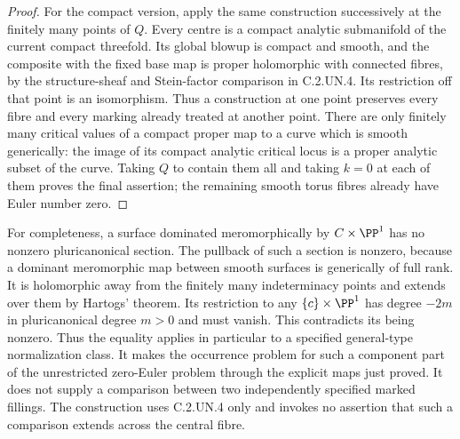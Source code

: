 \begin{proof}
For the compact version, apply the same construction successively
at the finitely many points of $Q$. Every centre is a compact
analytic submanifold of the current compact threefold. Its global
blowup is compact and smooth, and the composite with the fixed base
map is proper holomorphic with connected fibres, by the
structure-sheaf and Stein-factor comparison in C.2.UN.4. Its
restriction off that point is an isomorphism. Thus a construction
at one point preserves every fibre and every marking already
treated at another point. There are only finitely many critical
values of a compact proper map to a curve which is smooth
generically: the image of its compact analytic critical locus is
a proper analytic subset of the curve. Taking $Q$ to contain them
all and taking $k=0$ at each of them proves the final assertion;
the remaining smooth torus fibres already have Euler number zero.
\end{proof}

For completeness, a surface dominated meromorphically by
$C\times\PP^1$ has no nonzero pluricanonical section. The pullback
of such a section is nonzero, because a dominant meromorphic map
between smooth surfaces is generically of full rank. It is
holomorphic away from the finitely many indeterminacy points and
extends over them by Hartogs' theorem. Its restriction to any
$\{c\}\times\PP^1$ has degree $-2m$ in pluricanonical degree $m>0$
and must vanish. This contradicts its being nonzero. Thus the
equality applies in particular to a specified general-type
normalization class. It makes the occurrence problem for such a
component part of the unrestricted zero-Euler problem through the
explicit maps just proved. It does not supply a comparison between
two independently specified marked fillings. The construction
uses C.2.UN.4 only and invokes no assertion that such a comparison
extends across the central fibre.
